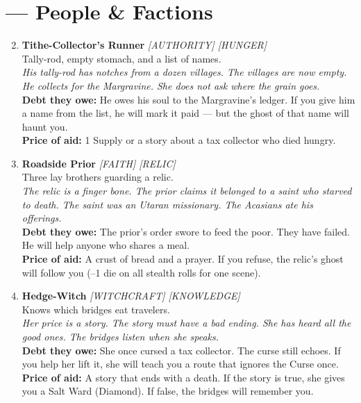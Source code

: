 \section*{ --- People \& Factions}
\label{sec:acasia-people}
\begin{enumerate}
\setcounter{enumi}{1}
\item \textbf{Tithe-Collector's Runner} \hfill {} \textit{[AUTHORITY] [HUNGER]} \\
  Tally-rod, empty stomach, and a list of names. \\
  \textit{His tally-rod has notches from a dozen villages. The villages are now empty. He collects for the Margravine. She does not ask where the grain goes.} \\
  \textbf{Debt they owe:} He owes his soul to the Margravine's ledger. If you give him a name from the list, he will mark it paid --- but the ghost of that name will haunt you. \\
  \textbf{Price of aid:} 1 Supply or a story about a tax collector who died hungry.

\item \textbf{Roadside Prior} \hfill {} \textit{[FAITH] [RELIC]} \\
  Three lay brothers guarding a relic. \\
  \textit{The relic is a finger bone. The prior claims it belonged to a saint who starved to death. The saint was an Utaran missionary. The Acasians ate his offerings.} \\
  \textbf{Debt they owe:} The prior's order swore to feed the poor. They have failed. He will help anyone who shares a meal. \\
  \textbf{Price of aid:} A crust of bread and a prayer. If you refuse, the relic's ghost will follow you (--1 die on all stealth rolls for one scene).

\item \textbf{Hedge-Witch} \hfill {} \textit{[WITCHCRAFT] [KNOWLEDGE]} \\
  Knows which bridges eat travelers. \\
  \textit{Her price is a story. The story must have a bad ending. She has heard all the good ones. The bridges listen when she speaks.} \\
  \textbf{Debt they owe:} She once cursed a tax collector. The curse still echoes. If you help her lift it, she will teach you a route that ignores the Curse once. \\
  \textbf{Price of aid:} A story that ends with a death. If the story is true, she gives you a Salt Ward (Diamond). If false, the bridges will remember you.


\end{enumerate}
